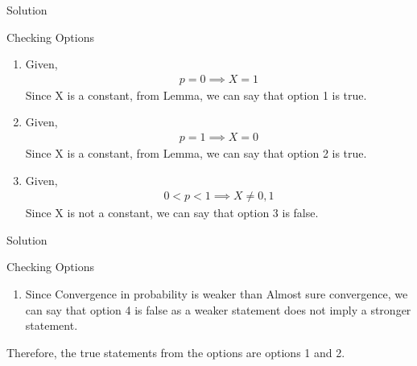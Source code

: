 \documentclass{beamer}
\begin{document}
\begin{frame}{Solution}
\begin{block}{Checking Options}
    \begin{enumerate}
    \item Given,
    \begin{align}\nonumber
        p = 0 \implies X = 1
    \end{align}
    Since X is a constant, from Lemma, we can say that option 1 is true.
    \item Given,
      \begin{align}\nonumber
        p = 1 \implies X = 0
    \end{align}
    Since X is a constant, from Lemma, we can say that option 2 is true.
    \item Given,
      \begin{align}\nonumber
        0 < p < 1 \implies X \neq 0,1 
    \end{align}
    Since X is not a constant, we can say that option 3 is false.
    
    \end{enumerate}
\end{block}
\end{frame}

\begin{frame}{Solution}
\begin{block}{Checking Options}
    \begin{enumerate}
        \item Since Convergence in probability is weaker than Almost sure convergence, we can say that option 4 is false as a weaker statement does not imply a stronger statement. 
    \end{enumerate}
    Therefore, the true statements from the options are options 1 and 2.
\end{block}    
\end{frame}
\end{document}
